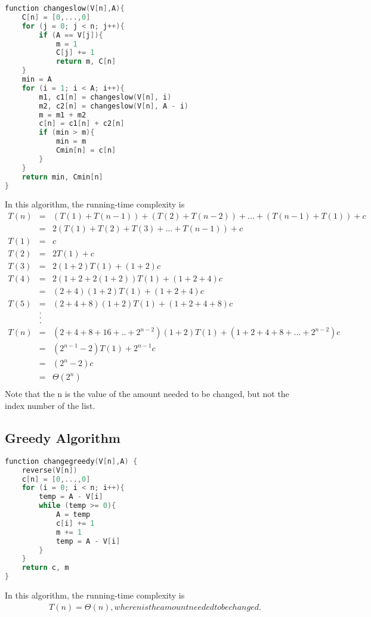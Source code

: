 \documentclass[11pt]{scrreprt}
\begin{document}
\begin{lstlisting}[language=c]
function changeslow(V[n],A){
	C[n] = [0,...,0]
	for (j = 0; j < n; j++){
		if (A == V[j]){
			m = 1
			C[j] += 1
			return m, C[n]
	}
	min = A
	for (i = 1; i < A; i++){
		m1, c1[n] = changeslow(V[n], i)
		m2, c2[n] = changeslow(V[n], A - i)
		m = m1 + m2
		c[n] = c1[n] + c2[n]
		if (min > m){
			min = m
			Cmin[n] = c[n]
		}
	}
	return min, Cmin[n]
}
\end{lstlisting}
In this algorithm, the running-time complexity is
\begin{eqnarray*}
T(n) 	& = & (T(1)+ T(n-1)) + (T(2) + T(n-2)) + ... + (T(n-1) + T(1)) + c\\
		& = & 2(T(1) + T(2) + T(3) + ... + T(n-1)) + c\\
T(1)	& = & c\\
T(2) 	& = & 2T(1) + c\\
T(3) 	& = & 2(1+2)T(1) + (1+2)c\\
T(4) 	& = & 2(1+2+2(1+2))T(1) + (1+2+4)c\\
	 	& = & (2+4)(1+2)T(1) + (1+2+4)c\\
T(5) 	& = & (2+4+8)(1+2)T(1) + (1+2+4+8)c\\
		& . & \\
		& . & \\
		& . & \\
T(n) 	& = & (2+4+8+16+..+2^{n-2})(1+2)T(1) + (1+2+4+8+...+2^{n-2})c\\
		& = & (2^{n-1}-2)T(1) + 2^{n-1}c\\
		& = & (2^n-2)c\\
		& = & \Theta(2^n)\\
\end{eqnarray*}
Note that the n is the value of the amount needed to be changed, but not the index number of the list.



\subsection{Greedy Algorithm}

\begin{lstlisting}[language=c]
function changegreedy(V[n],A) {
	reverse(V[n])
	c[n] = [0,...,0]
	for (i = 0; i < n; i++){
		temp = A - V[i]
		while (temp >= 0){
		    A = temp
		    c[i] += 1
		    m += 1
		    temp = A - V[i]
		}
	}
	return c, m
}
\end{lstlisting}

In this algorithm, the running-time complexity is
\begin{eqnarray*}
T(n) = \Theta(n), where n is the amount needed to be changed.
\end{eqnarray*}
\end{document}
